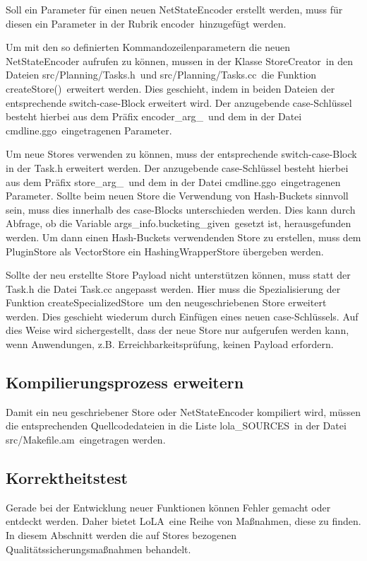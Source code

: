 \documentclass[12pt,a4paper,titlepage]{scrartcl}
\renewcommand \( {\left (}
\renewcommand \) {\right )}
\renewcommand \[ {\left [}
\renewcommand \] {\right ]}
\newcommand \Flqq {\flqq\ }
\newcommand{\lola}{\frqq LoLA\Flqq}
\begin{document}
Soll ein Parameter für einen neuen NetStateEncoder erstellt werden, muss für diesen ein Parameter in der Rubrik \frqq encoder\Flqq hinzugefügt werden.

Um mit den so definierten Kommandozeilenparametern die neuen NetStateEncoder aufrufen zu können, mussen in der Klasse \frqq StoreCreator\Flqq in den Dateien \frqq src/Planning/Tasks.h\Flqq und \frqq src/Planning/Tasks.cc\Flqq die Funktion \frqq createStore()\Flqq erweitert werden. Dies geschieht, indem in beiden Dateien der entsprechende switch-case-Block erweitert wird. Der anzugebende case-Schlüssel besteht hierbei aus dem Präfix \frqq encoder\_arg\_\Flqq und dem in der Datei \frqq cmdline.ggo\Flqq eingetragenen Parameter.

Um neue Stores verwenden zu können, muss der entsprechende switch-case-Block in der Task.h erweitert werden. Der anzugebende case-Schlüssel besteht hierbei aus dem Präfix \frqq store\_arg\_\Flqq und dem in der Datei \frqq cmdline.ggo\Flqq eingetragenen Parameter. Sollte beim neuen Store die Verwendung von Hash-Buckets sinnvoll sein, muss dies innerhalb des case-Blocks unterschieden werden. Dies kann durch Abfrage, ob die Variable \frqq args\_info.bucketing\_given\Flqq gesetzt ist, herausgefunden werden. Um dann einen Hash-Buckets verwendenden Store zu erstellen, muss dem PluginStore als VectorStore ein HashingWrapperStore übergeben werden.

Sollte der neu erstellte Store Payload nicht unterstützen können, muss statt der Task.h die Datei Task.cc angepasst werden. Hier muss die Spezialisierung der Funktion \frqq createSpecializedStore\Flqq um den neugeschriebenen Store erweitert werden. Dies geschieht wiederum durch Einfügen eines neuen case-Schlüssels. Auf dies Weise wird sichergestellt, dass der neue Store nur aufgerufen werden kann, wenn Anwendungen, z.B. Erreichbarkeitsprüfung, keinen Payload erfordern.

\subsection{Kompilierungsprozess erweitern}
Damit ein neu geschriebener Store oder NetStateEncoder kompiliert wird, müssen die entsprechenden Quellcodedateien in die Liste \frqq lola\_SOURCES\Flqq in der Datei \frqq src/Makefile.am\Flqq eingetragen werden.

\subsection{Korrektheitstest}
Gerade bei der Entwicklung neuer Funktionen können Fehler gemacht oder entdeckt werden. Daher bietet \lola eine Reihe von Maßnahmen, diese zu finden. In diesem Abschnitt werden die auf Stores bezogenen Qualitätssicherungsmaßnahmen behandelt.
\end{document}
